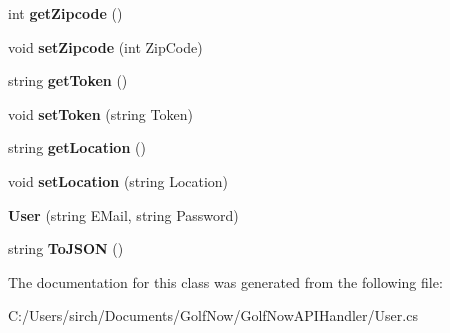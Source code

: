 \begin{DoxyCompactItemize}
\mbox{\label{class_golf_now_a_p_i_1_1_user_a2da8725e48a685eedfd01402f088c529}} 
int {\bfseries get\+Zipcode} ()
\item 
\mbox{\label{class_golf_now_a_p_i_1_1_user_ab15a9abd830e463f82dd8ab7e25ee9ab}} 
void {\bfseries set\+Zipcode} (int Zip\+Code)
\item 
\mbox{\label{class_golf_now_a_p_i_1_1_user_a9613eb4736c5fa5ae42d39463c96fd40}} 
string {\bfseries get\+Token} ()
\item 
\mbox{\label{class_golf_now_a_p_i_1_1_user_a9d711aff690c9e9270d4d9fd70af759c}} 
void {\bfseries set\+Token} (string Token)
\item 
\mbox{\label{class_golf_now_a_p_i_1_1_user_a3d02e69413df24197ecd7c6da30284fc}} 
string {\bfseries get\+Location} ()
\item 
\mbox{\label{class_golf_now_a_p_i_1_1_user_a0428ab45ee433827fcaeabfb88a4d0df}} 
void {\bfseries set\+Location} (string Location)
\item 
\mbox{\label{class_golf_now_a_p_i_1_1_user_a3a4cac2033e314b8c38e26b8f3bf7781}} 
{\bfseries User} (string E\+Mail, string Password)
\item 
\mbox{\label{class_golf_now_a_p_i_1_1_user_a2e33a3d577e16ab20f017a26bf4baa2d}} 
string {\bfseries To\+J\+S\+ON} ()
\end{DoxyCompactItemize}


The documentation for this class was generated from the following file\+:\begin{DoxyCompactItemize}
\item 
C\+:/\+Users/sirch/\+Documents/\+Golf\+Now/\+Golf\+Now\+A\+P\+I\+Handler/User.\+cs\end{DoxyCompactItemize}
